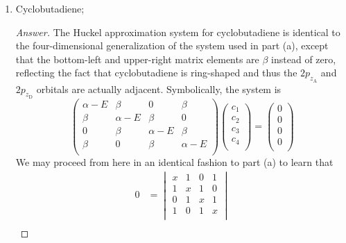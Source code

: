 \documentclass[../psets.tex]{subfiles}
\begin{document}
\begin{enumerate}
\begin{enumerate}
        \item Cyclobutadiene;
        \begin{proof}[Answer]
            The Huckel approximation system for cyclobutadiene is identical to the four-dimensional generalization of the system used in part (a), except that the bottom-left and upper-right matrix elements are $\beta$ instead of zero, reflecting the fact that cyclobutadiene is ring-shaped and thus the $2p_{z_\text{A}}$ and $2p_{z_\text{D}}$ orbitals are actually adjacent. Symbolically, the system is
            \begin{equation*}
                \begin{pmatrix}
                    \alpha-E & \beta & 0 & \beta\\
                    \beta & \alpha-E & \beta & 0\\
                    0 & \beta & \alpha-E & \beta\\
                    \beta & 0 & \beta & \alpha-E\\
                \end{pmatrix}
                \begin{pmatrix}
                    c_1\\
                    c_2\\
                    c_3\\
                    c_4\\
                \end{pmatrix}
                =
                \begin{pmatrix}
                    0\\
                    0\\
                    0\\
                    0\\
                \end{pmatrix}
            \end{equation*}
            We may proceed from here in an identical fashion to part (a) to learn that
            \begin{align*}
                0 &=
                \begin{vmatrix}
                    x & 1 & 0 & 1\\
                    1 & x & 1 & 0\\
                    0 & 1 & x & 1\\
                    1 & 0 & 1 & x\\
                \end{vmatrix}\\

\end{align*}
\end{proof}
\end{enumerate}
\end{enumerate}
\end{document}
